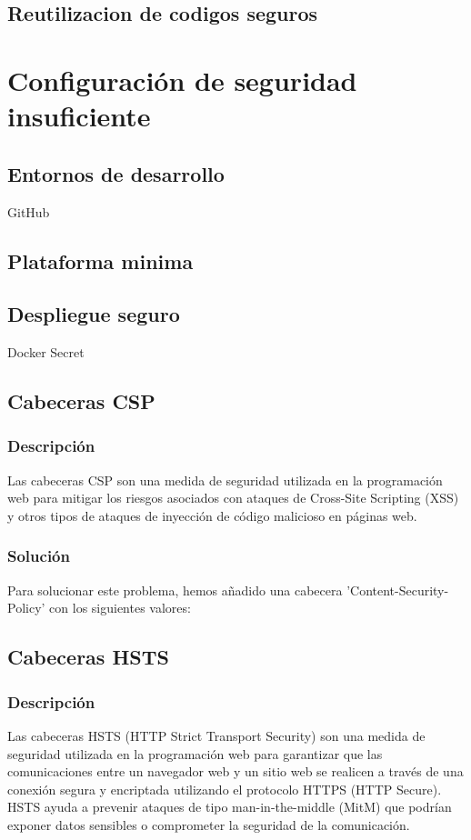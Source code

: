 \documentclass{report}
\begin{document}
            \subsection{Reutilizacion de codigos seguros}
            \clearpage
        \section{Configuración de seguridad insuficiente}
            \subsection{Entornos de desarrollo}
                    GitHub
            \subsection{Plataforma minima}
            \subsection{Despliegue seguro}
                    Docker Secret
            \subsection{Cabeceras CSP}
                \subsubsection{Descripción}
                    Las cabeceras CSP son una medida de seguridad utilizada en la programación web para mitigar los riesgos asociados con ataques de Cross-Site Scripting (XSS) y otros tipos de ataques de inyección de código malicioso en páginas web.
                \subsubsection{Solución}
                    Para solucionar este problema, hemos añadido una cabecera 'Content-Security-Policy' con los siguientes valores:
            \subsection{Cabeceras HSTS}
                \subsubsection{Descripción}
                Las cabeceras HSTS (HTTP Strict Transport Security) son una medida de seguridad utilizada en la programación web para garantizar que las comunicaciones entre un navegador web y un sitio web se realicen a través de una conexión segura y encriptada utilizando el protocolo HTTPS (HTTP Secure). HSTS ayuda a prevenir ataques de tipo man-in-the-middle (MitM) que podrían exponer datos sensibles o comprometer la seguridad de la comunicación.
\end{document}
